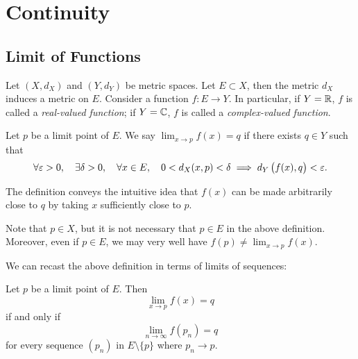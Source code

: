 \chapter{Continuity}\label{chap:real-analysis_continuity}
\section{Limit of Functions}
Let $(X,d_X)$ and $(Y,d_Y)$ be metric spaces. Let $E\subset X$, then the metric $d_X$ induces a metric on $E$. Consider a function $f:E\to Y$. 
In particular, if $Y=\mathbb R$, $f$ is called a \emph{real-valued function}; if $Y=\mathbb C$, $f$ is called a \emph{complex-valued function}.

\begin{definition}\label{defn:limit-function}
Let $p$ be a limit point of $E$. We say $\displaystyle\lim_{x\to p}f(x)=q$ if there exists $q\in Y$ such that
\[\forall\varepsilon>0,\quad\exists\delta>0,\quad\forall x\in E,\quad0<d_X(x,p)<\delta\implies d_Y\left(f(x),q\right)<\varepsilon.\]
\end{definition}

The definition conveys the intuitive idea that $f(x)$ can be made arbitrarily close to $q$ by taking $x$ sufficiently close to $p$.

\begin{remark}
Note that $p\in X$, but it is not necessary that $p\in E$ in the above definition. Moreover, even if $p\in E$, we may very well have $\displaystyle f(p)\neq\lim_{x\to p}f(x)$.
\end{remark}

We can recast the above definition in terms of limits of sequences:
\begin{lemma}\label{limit-func-seq}
Let $p$ be a limit point of $E$. Then
\begin{equation*}\tag{1}
\lim_{x\to p}f(x)=q
\end{equation*}
if and only if
\begin{equation*}\tag{2}
\lim_{n\to\infty}f(p_n)=q
\end{equation*}
for every sequence $(p_n)$ in $E\setminus\{p\}$ where $p_n\to p$.
\end{lemma}

